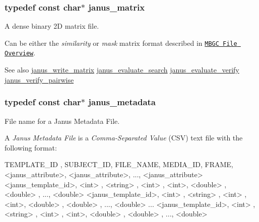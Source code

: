 \subsubsection[{janus\+\_\+matrix}]{\setlength{\rightskip}{0pt plus 5cm}typedef const char$\ast$ {\bf janus\+\_\+matrix}}\label{group__janus__io_ga3d3454709ac3ce27a99d42444408f16d}


A dense binary 2\+D matrix file. 

Can be either the {\itshape similarity} or {\itshape mask} matrix format described in \href{http://openbiometrics.org/doxygen/latest/MBGC_file_overview.pdf#page=12}{\tt M\+B\+G\+C File Overview}. \begin{DoxySeeAlso}{See also}
\hyperlink{group__janus__io_ga48915adf796413b4e6a48cb41cba6065}{janus\+\_\+write\+\_\+matrix} \hyperlink{group__janus__io_gaf478fa71592fe8de815545057ac03b15}{janus\+\_\+evaluate\+\_\+search} \hyperlink{group__janus__io_gaa0efe4b3c2feea34c685db1fcea6e9f9}{janus\+\_\+evaluate\+\_\+verify} \hyperlink{group__janus__io_gaa7eb8df4fa2fe3f901280b2095c1c9df}{janus\+\_\+verify\+\_\+pairwise} 
\end{DoxySeeAlso}
\hypertarget{group__janus__io_gaeddd0e276eebe8616d41808eed8dff16}{}
\subsubsection[{janus\+\_\+metadata}]{\setlength{\rightskip}{0pt plus 5cm}typedef const char$\ast$ {\bf janus\+\_\+metadata}}\label{group__janus__io_gaeddd0e276eebe8616d41808eed8dff16}


File name for a Janus Metadata File. 

A {\itshape Janus Metadata File} is a {\itshape Comma-\/\+Separated Value} (C\+S\+V) text file with the following format\+:

\begin{DoxyVerb}TEMPLATE_ID        , SUBJECT_ID, FILE_NAME, MEDIA_ID, FRAME, <janus_attribute>, <janus_attribute>, ..., <janus_attribute>
<janus_template_id>, <int>     , <string> , <int>   , <int>, <double>         , <double>         , ..., <double>
<janus_template_id>, <int>     , <string> , <int>   , <int>, <double>         , <double>         , ..., <double>
...
<janus_template_id>, <int>     , <string> , <int>   , <int>, <double>         , <double>         , ..., <double>
\end{DoxyVerb}


